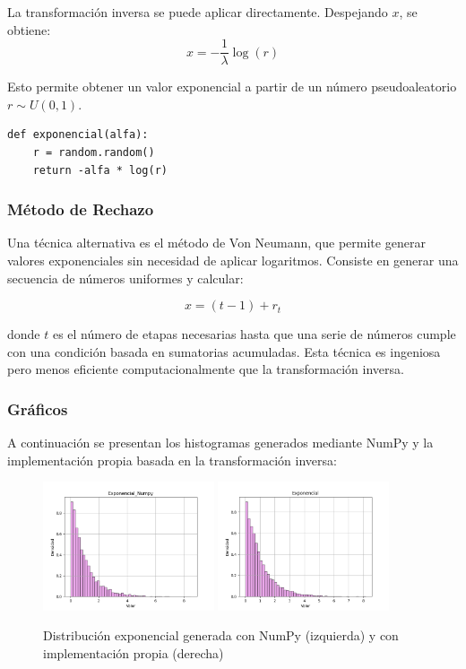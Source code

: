 \documentclass{article}
\begin{document}
La transformación inversa se puede aplicar directamente. Despejando \( x \), se obtiene:
\[
x = -\frac{1}{\lambda} \log(r)
\]

Esto permite obtener un valor exponencial a partir de un número pseudoaleatorio \( r \sim U(0, 1) \).

\begin{verbatim}
def exponencial(alfa):
    r = random.random()
    return -alfa * log(r)
\end{verbatim}

\subsubsection{Método de Rechazo}
Una técnica alternativa es el método de Von Neumann, que permite generar valores exponenciales sin necesidad de aplicar logaritmos. Consiste en generar una secuencia de números uniformes y calcular:

\[
x = (t - 1) + r_t
\]

donde \( t \) es el número de etapas necesarias hasta que una serie de números cumple con una condición basada en sumatorias acumuladas. Esta técnica es ingeniosa pero menos eficiente computacionalmente que la transformación inversa.

\subsubsection{Gráficos}
A continuación se presentan los histogramas generados mediante NumPy y la implementación propia basada en la transformación inversa:

\begin{figure}[H]
    \centering
    \includegraphics[width=0.45\textwidth]{Imagenes/Distribucion_Exponencial_Numpy.png}
    \includegraphics[width=0.45\textwidth]{Imagenes/Distribucion_Exponencial.png}
    \caption{Distribución exponencial generada con NumPy (izquierda) y con implementación propia (derecha)}
    \label{fig:exponencial}
\end{figure}
\end{document}
